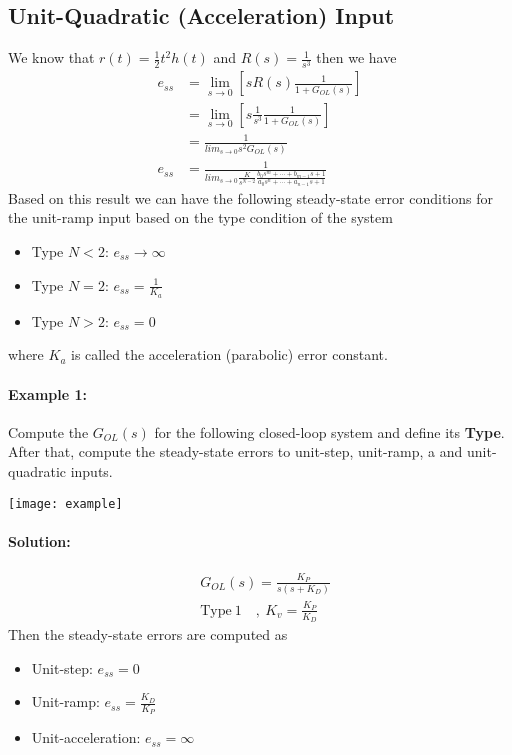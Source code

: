 \documentclass[twoside]{article}
\begin{document}
\subsection*{Unit-Quadratic (Acceleration) Input}
%
We know that $r(t) = \frac{1}{2} t^2 h(t)$ and $R(s) = \frac{1}{s^3}$ then
we have
\begin{align*}
e_{ss} &= \lim_{s \to 0} \left[ s R(s) \frac{1}{1
         + G_{OL} (s) } \right]
\\
&= \lim_{s \to 0} \left[ s \frac{1}{s^3} \frac{1}{1
         + G_{OL} (s) } \right]
\\
 &= \frac{1}{lim_{s \to 0} s^{2} G_{OL} (s) }
\\
e_{ss} &= \frac{1}{lim_{s \to 0} \frac{K}{s^{N-2}} \frac{b_0 s^m + \cdots + b_{m-1} s + 1}{a_0 s^n + \cdots + a_{n-1} s + 1} }
\end{align*}
%
Based on this result we can have the following steady-state
error conditions for the unit-ramp input based on the type 
condition of the system
%
\begin{itemize}
\item Type $N < 2$: $e_{ss} \to  \infty$
\item Type $N = 2$: $e_{ss} = \frac{1}{K_{a}}$
\item Type $N > 2$: $e_{ss} = 0$
\end{itemize}
%
where $K_a$ is called the acceleration (parabolic) error constant.

\paragraph{Example 1:} Compute the $G_{OL}(s)$ for the following closed-loop
system and define its \textbf{Type}. After that, compute the steady-state errors to unit-step, unit-ramp, a
and unit-quadratic inputs.

\begin{center}
\begin{minipage}[h]{0.75\linewidth}
    \begin{center}
      \texttt{[image: example]}
    \end{center}
\end{minipage}
\end{center}

\paragraph{Solution:} 
%
\begin{align*}
&G_{OL}(s) =  \frac{K_P}{s ( s + K_D)} 
\\
&\mathrm{Type} \ 1  \quad, \ K_v = \frac{K_P}{K_D}
\end{align*}
%
Then the steady-state errors are computed as
\begin{itemize}
\item Unit-step: $e_{ss} = 0$
\item Unit-ramp: $e_{ss} = \frac{K_D}{K_P}$
\item Unit-acceleration: $e_{ss} = \infty$
\end{itemize}
\end{document}
